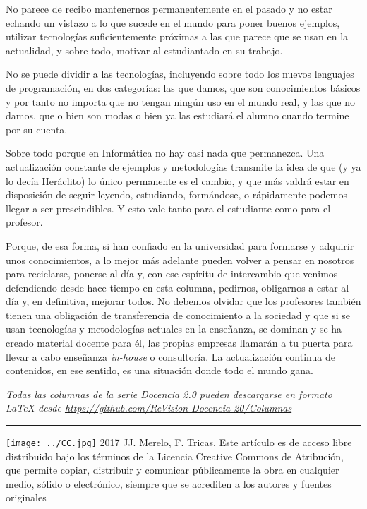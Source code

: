 \documentclass[twoside,10pt]{article}
\newcommand{\surl}[1]{{\small\url{#1}}}
\newcounter{vol}
\begin{document}
\begin{multicols}{2}
No parece de
recibo mantenernos permanentemente en el pasado y no estar
echando un vistazo a lo que sucede en el mundo para poner
buenos ejemplos, utilizar tecnologías suficientemente próximas
a las que parece que se usan en la actualidad, y sobre todo,
motivar al estudiantado en su trabajo. 

No se puede dividir a
las tecnologías, incluyendo sobre todo los nuevos lenguajes de
programación, en dos categorías: las que damos, que son
conocimientos básicos y por tanto no importa que no tengan
ningún uso en el mundo real, y las que no damos, que o bien
son modas o bien ya las estudiará el alumno cuando termine por
su cuenta. 

Sobre todo porque en Informática no hay casi nada que permanezca. Una
actualización constante de ejemplos y metodologías transmite la idea
de que (y ya lo decía Heráclito) lo único permanente es el cambio, y
que más valdrá estar en disposición de seguir leyendo, estudiando,
formándose, o rápidamente podemos llegar a ser prescindibles.  Y esto
vale tanto para el estudiante como para el profesor. 

Porque, de esa forma, si han confiado en la universidad para formarse
y adquirir unos conocimientos, a lo mejor más adelante pueden volver a
pensar en nosotros para reciclarse, ponerse al día y, con ese espíritu
de intercambio que venimos defendiendo desde hace tiempo en esta
columna, pedirnos, obligarnos a estar al día y, en definitiva, mejorar
todos. No debemos olvidar que los profesores también tienen una
obligación de transferencia de conocimiento a la sociedad y que si se
usan tecnologías y metodologías actuales en la enseñanza, se dominan y
se ha creado material docente para él, las propias empresas llamarán a
tu puerta para llevar a cabo enseñanza {\em in-house} o
consultoría. La actualización continua de contenidos, en ese sentido,
es una situación donde todo el mundo gana. 


\noindent\emph{Todas las columnas de la serie Docencia 2.0
pueden descargarse en formato LaTeX desde
\surl{https://github.com/ReVision-Docencia-20/Columnas}}

\noindent\rule{90mm}{1pt}

{\small \noindent\texttt{[image: ../CC.jpg]} 2017 JJ. Merelo, F. Tricas. Este artículo es de acceso libre distribuido bajo los términos
de la Licencia Creative Commons de Atribución, que permite copiar,
distribuir y comunicar públicamente la obra en cualquier medio, sólido
o electrónico, siempre que se acrediten a los autores y fuentes
originales}

\end{multicols}
\end{document}
